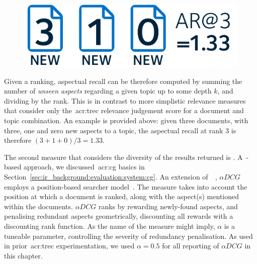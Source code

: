 \begin{figure}
    \begin{center}
    \vspace*{-10mm}
    \includegraphics[width=1\textwidth]{figures/ch8-aspectual_recall.pdf}
    \end{center}
    \label{fig:aspectual_recall}
\end{figure}

Given a ranking, aspectual recall can be therefore computed by summing the number of \emph{unseen aspects} regarding a given topic up to some depth $k$, and dividing by the rank. This is in contrast to more simplistic relevance measures that consider only the~\gls{acr:trec} relevance judgement score for a document and topic combination. An example is provided above: given three documents, with three, one and zero new aspects to a topic, the aspectual recall at rank 3 is therefore $(3+1+0)/3 = 1.33$.


The second measure that considers the diversity of the results returned is . A~-based approach, we discussed~\gls{acr:cg} basics in Section~\ref{sec:ir_background:evaluation:system:cg}. An extension of~~\citep{jarvelin2002cg}, $\alpha DCG$ employs a position-based searcher model~\citep{clarke2008adcg}. The measure takes into account the position at which a document is ranked, along with the aspect(s) mentioned within the documents. $\alpha DCG$ ranks by rewarding newly-found aspects, and penalising redundant aspects geometrically, discounting all rewards with a discounting rank function. As the name of the measure might imply, $\alpha$ is a tuneable parameter, controlling the severity of redundancy penalisation. As used in prior~\gls{acr:trec} experimentation, we used $\alpha=0.5$ for all reporting of $\alpha DCG$ in this chapter.

